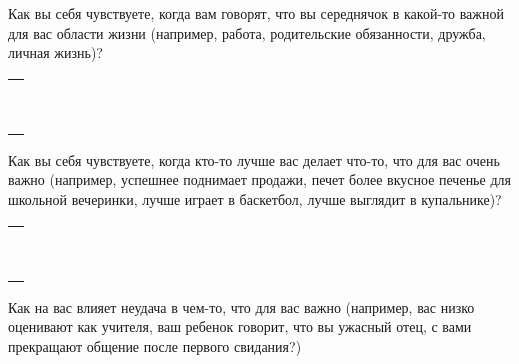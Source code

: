 \newpage
{}

\begin{itemize}
	\itemWritingHand Как вы себя чувствуете, когда вам говорят, что вы середнячок в какой-то важной для вас области жизни (например, работа, родительские обязанности, дружба, личная жизнь)?
\end{itemize}

\setlength{\extrarowheight}{2mm}
\begin{tabularx}{\textwidth}{X}
	\\
	\arrayrulecolor{gray}\hline\\
	\hline\\
	\hline\\
	\hline\\
	\hline\\
	\hline\\
	\hline\\
	\hline\\	
	\hline\\
	\hline\\
\end{tabularx}
\setlength{\extrarowheight}{0mm}

\begin{itemize}
	\itemWritingHand Как вы себя чувствуете, когда кто-то лучше вас делает что-то, что для вас очень важно (например, успешнее поднимает продажи, печет более вкусное печенье для школьной вечеринки, лучше играет в баскетбол, лучше выглядит в купальнике)?
\end{itemize}

\setlength{\extrarowheight}{2mm}
\begin{tabularx}{\textwidth}{X}
	\\
	\arrayrulecolor{gray}\hline\\
	\hline\\
	\hline\\
	\hline\\
	\hline\\
	\hline\\
	\hline\\
	\hline\\
	\hline\\
	\hline\\	
\end{tabularx}
\setlength{\extrarowheight}{0mm}

\begin{itemize}
	\itemWritingHand Как на вас влияет неудача в чем-то, что для вас важно (например, вас низко оценивают как учителя, ваш ребенок говорит, что вы ужасный отец, с вами прекращают общение после первого свидания?)
\end{itemize}

